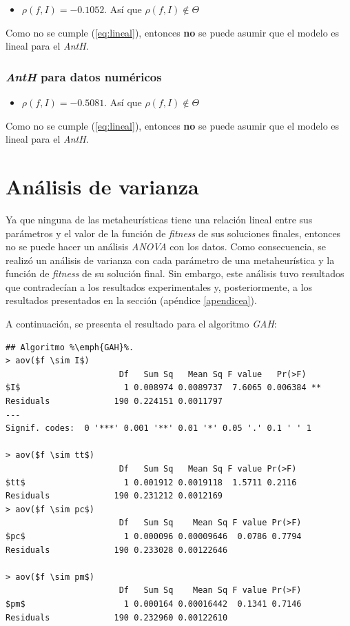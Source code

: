 \begin{itemize}
    \item $\rho(f, I) = -0.1052$. Así que $\rho(f, I) \notin \Theta$
\end{itemize}

    Como no se cumple (\ref{eq:lineal}), entonces \textbf{no} se puede asumir
que el modelo es lineal para el \emph{AntH}.

\subsubsection{\emph{AntH} para datos numéricos}

\begin{itemize}
    \item $\rho(f, I) = -0.5081$. Así que $\rho(f, I) \notin \Theta$
\end{itemize}

    Como no se cumple (\ref{eq:lineal}), entonces \textbf{no} se puede asumir
que el modelo es lineal para el \emph{AntH}.

\section{Análisis de varianza}

    Ya que ninguna de las metaheurísticas tiene una relación lineal entre sus
parámetros y el valor de la función de \emph{fitness} de sus soluciones finales,
entonces no se puede hacer un análisis \emph{ANOVA} con los datos. Como consecuencia,
se realizó un análisis de varianza con cada parámetro de una metaheurística y la
función de \emph{fitness} de su solución final. Sin embargo, este análisis tuvo
resultados que contradecían a los resultados experimentales y, posteriormente,
a los resultados presentados en la sección (apéndice \ref{apendicea}). 

    A continuación, se presenta el resultado para el algoritmo \emph{GAH}:

\begin{lstlisting}[float=h, caption=Análisis de Varianza para el \emph{GAH}, label=AOV-GAH]
## Algoritmo %\emph{GAH}%.
> aov($f \sim I$)
                       Df   Sum Sq   Mean Sq F value   Pr(>F)   
$I$                     1 0.008974 0.0089737  7.6065 0.006384 **
Residuals             190 0.224151 0.0011797                    
---
Signif. codes:  0 '***' 0.001 '**' 0.01 '*' 0.05 '.' 0.1 ' ' 1 

> aov($f \sim tt$)
                       Df   Sum Sq   Mean Sq F value Pr(>F)
$tt$                    1 0.001912 0.0019118  1.5711 0.2116
Residuals             190 0.231212 0.0012169               
> aov($f \sim pc$)
                       Df   Sum Sq    Mean Sq F value Pr(>F)
$pc$                    1 0.000096 0.00009646  0.0786 0.7794
Residuals             190 0.233028 0.00122646

> aov($f \sim pm$)
                       Df   Sum Sq    Mean Sq F value Pr(>F)
$pm$                    1 0.000164 0.00016442  0.1341 0.7146
Residuals             190 0.232960 0.00122610               
\end{lstlisting}


